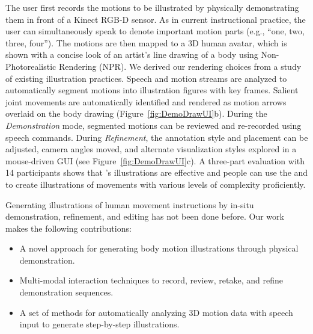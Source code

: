 The user first records the motions to be illustrated by physically demonstrating them in front of a Kinect RGB-D sensor. As in current instructional practice, the user can simultaneously speak to denote important motion parts (e.g., ``one, two, three, four'').
The motions are then mapped to a 3D human avatar, which is shown with a concise look of an artist's line drawing of a body using Non-Photorealistic Rendering (NPR). We derived our rendering choices from a study of existing illustration practices.
%
Speech and motion streams are analyzed to automatically segment motions into illustration figures with key frames. Salient joint movements are automatically identified and rendered as motion arrows overlaid on the body drawing (Figure~\ref{fig:DemoDrawUI}b).
%
During the {\em Demonstration} mode, segmented motions can be reviewed and re-recorded using speech commands. %
%
During \emph{Refinement}, the annotation style and placement can be adjusted, camera angles moved, and alternate visualization styles explored in a mouse-driven GUI (see Figure~\ref{fig:DemoDrawUI}c).
%
A three-part evaluation with 14 participants shows that \systemname{}'s illustrations are effective and people can use the \phaseI{} and \phaseII{} to create illustrations of movements with various levels of complexity proficiently.

Generating illustrations of human movement instructions by in-situ demonstration, refinement, and editing has not been done before.
Our work makes the following contributions:
\begin{itemize}
  \itemsep -2pt
  \item A novel approach for generating body motion illustrations through physical demonstration.
  \item Multi-modal interaction techniques to record, review, retake, and refine demonstration sequences.
  \item A set of methods for automatically analyzing 3D motion data with speech input to generate step-by-step illustrations.
\end{itemize}


